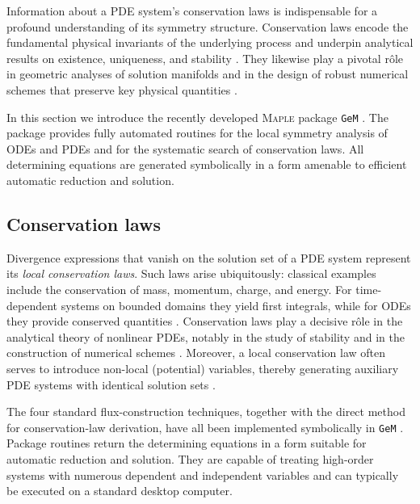 \documentclass[alpha-refs, 12pt]{wiley-article}
\begin{document}
Information about a PDE system's conservation laws is indispensable for a profound understanding of its symmetry structure. Conservation laws encode the fundamental physical invariants of the underlying process and underpin analytical results on existence, uniqueness, and stability \cite{Olver1993, Evans2010}. They likewise play a pivotal rôle in geometric analyses of solution manifolds \cite{Bluman1987} and in the design of robust numerical schemes that preserve key physical quantities \cite{LeVeque2002}.

In this section we introduce the recently developed \textsc{Maple} package \texttt{GeM} \cite{Cheviakov2007}. The package provides fully automated routines for the local symmetry analysis of ODEs and PDEs and for the systematic search of conservation laws.  All determining equations are generated symbolically in a form amenable to efficient automatic reduction and solution.

\subsection{Conservation laws}\label{ssec:CL}

Divergence expressions that vanish on the solution set of a PDE system represent its \emph{local conservation laws}.  
Such laws arise ubiquitously: classical examples include the conservation of mass, momentum, charge, and energy. For time-dependent systems on bounded domains they yield first integrals, while for ODEs they provide conserved quantities \cite{Cheviakov2010}. Conservation laws play a decisive rôle in the analytical theory of nonlinear PDEs, notably in the study of stability and in the construction of numerical schemes \cite{Lax1968, Knops1984}. Moreover, a local conservation law often serves to introduce non-local (potential) variables, thereby generating auxiliary PDE systems with identical solution sets \cite{Bluman1987, Sjoberg2004}.

The four standard flux-construction techniques, together with the direct method for conservation-law derivation, have all been implemented symbolically in \texttt{GeM} \cite{Cheviakov2007}.  Package routines return the determining equations in a form suitable for automatic reduction and solution. They are capable of treating high-order systems with numerous dependent and independent variables and can typically be executed on a standard desktop computer.
\end{document}
